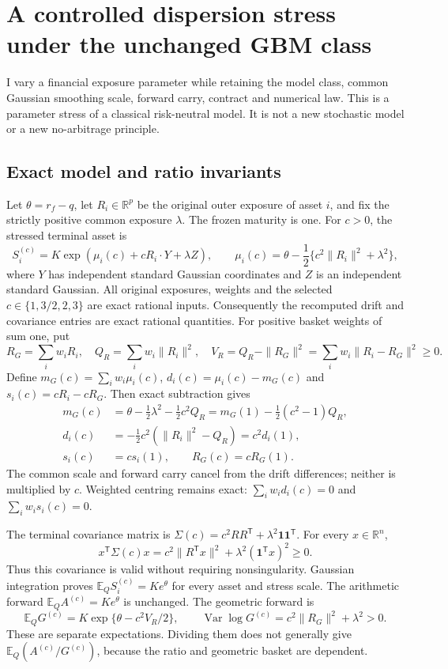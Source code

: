 \section{A controlled dispersion stress under the unchanged GBM class}
\label{supp:dispersion-scaling-proof}

I vary a financial exposure parameter while retaining the model class,
common Gaussian smoothing scale, forward carry, contract and numerical
law. This is a parameter stress of a classical risk-neutral model. It is
not a new stochastic model or a new no-arbitrage principle.

\subsection{Exact model and ratio invariants}

Let $\theta=r_f-q$, let $R_i\in\mathbb R^p$ be the original outer
exposure of asset $i$, and fix the strictly positive common exposure
$\lambda$. The frozen maturity is one. For $c>0$, the stressed terminal
asset is
\[
 S_i^{(c)}=K\exp\!\left(\mu_i(c)+cR_i\cdot Y+\lambda Z\right),
 \qquad
 \mu_i(c)=\theta-\frac12\{c^2\|R_i\|^2+\lambda^2\},
\]
where $Y$ has independent standard Gaussian coordinates and $Z$ is an
independent standard Gaussian. All original exposures, weights and
the selected $c\in\{1,3/2,2,3\}$ are exact rational inputs.
Consequently the recomputed drift and covariance entries are exact
rational quantities. For positive basket weights of sum one, put
\[
 R_G=\sum_iw_iR_i,\quad Q_R=\sum_iw_i\|R_i\|^2,\quad
 V_R=Q_R-\|R_G\|^2=\sum_iw_i\|R_i-R_G\|^2\geq0.
\]
Define $m_G(c)=\sum_iw_i\mu_i(c)$,
$d_i(c)=\mu_i(c)-m_G(c)$ and
$s_i(c)=cR_i-cR_G$. Then exact subtraction gives
\begin{align*}
 m_G(c)&=\theta-\tfrac12\lambda^2-\tfrac12c^2Q_R
       =m_G(1)-\tfrac12(c^2-1)Q_R,\\
 d_i(c)&=-\tfrac12c^2(\|R_i\|^2-Q_R)=c^2d_i(1),\\
 s_i(c)&=cs_i(1),\qquad R_G(c)=cR_G(1).
\end{align*}
The common scale and forward carry cancel from the drift differences;
neither is multiplied by $c$. Weighted centring remains exact:
$\sum_iw_id_i(c)=0$ and $\sum_iw_is_i(c)=0$.

The terminal covariance matrix is
$\Sigma(c)=c^2RR^{\mathsf T}+\lambda^2\mathbf1\mathbf1^{\mathsf T}$.
For every $x\in\mathbb R^n$,
\[
 x^{\mathsf T}\Sigma(c)x
 =c^2\|R^{\mathsf T}x\|^2+\lambda^2(\mathbf1^{\mathsf T}x)^2\geq0.
\]
Thus this covariance is valid without requiring nonsingularity. Gaussian
integration proves
$\mathbb E_Q S_i^{(c)}=K e^\theta$ for every asset and stress scale.
The arithmetic forward $\mathbb E_Q A^{(c)}=K e^\theta$ is unchanged.
The geometric forward is
\[
 \mathbb E_Q G^{(c)}=K\exp\{\theta-c^2V_R/2\},\qquad
 \operatorname{Var}\log G^{(c)}=c^2\|R_G\|^2+\lambda^2>0.
\]
These are separate expectations. Dividing them does not generally give
$\mathbb E_Q(A^{(c)}/G^{(c)})$, because the ratio and geometric basket
are dependent.

